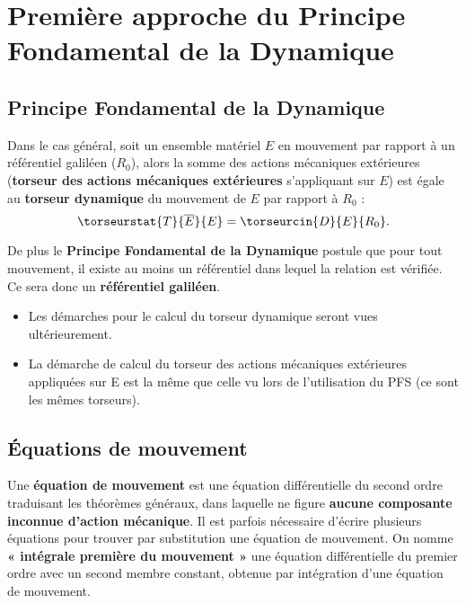 \section[PFD : cas général]{Première approche du Principe Fondamental de la Dynamique}

\subsection{Principe Fondamental de la Dynamique}

\begin{defi}
Dans le cas général, soit un ensemble matériel $E$ en mouvement par rapport à un référentiel galiléen ($R_0$), alors la somme des actions mécaniques extérieures (\textbf{torseur des actions mécaniques extérieures} s'appliquant sur $E$) est égale au \textbf{torseur dynamique} du mouvement de $E$ par rapport à $R_0$ :
$$
\torseurstat{T}{\overline{E}}{E}=\torseurcin{D}{E}{R_0}.
$$

De plus le \textbf{Principe Fondamental de la Dynamique} postule que pour tout mouvement, il existe au moins un référentiel dans lequel la relation est vérifiée. Ce sera donc un \textbf{référentiel galiléen}.

\end{defi}

\begin{remarque}
\begin{itemize}
\item Les démarches pour le calcul du torseur dynamique seront vues ultérieurement.
\item La démarche de calcul du torseur des actions mécaniques extérieures appliquées sur E est la  même que celle vu lors de l'utilisation du PFS (ce sont les mêmes torseurs). 
\end{itemize}
\end{remarque}

\subsection{Équations de mouvement}

\begin{defi}

Une \textbf{équation de mouvement} est une équation différentielle du second ordre traduisant les théorèmes généraux, dans laquelle ne figure \textbf{aucune composante inconnue d'action mécanique}. Il est parfois nécessaire d'écrire plusieurs équations pour trouver par substitution une équation de mouvement. On nomme \textbf{« intégrale première du mouvement »} une équation différentielle du premier ordre avec un second membre constant, obtenue par  intégration d'une équation de mouvement. 
\end{defi}

